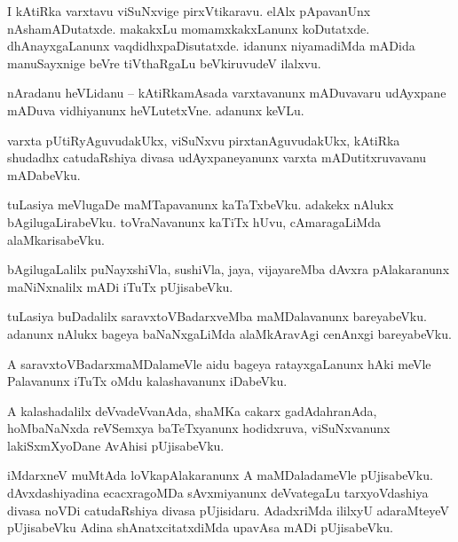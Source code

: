 \documentclass{article}
\begin{document}
\begin{mn}%
I kAtiRka varxtavu viSuNxvige pirxVtikaravu. elAlx pApavanUnx nAshamADutatxde. makakxLu 
momamxkakxLanunx koDutatxde. dhAnayxgaLanunx vaqdidhxpaDisutatxde. idanunx niyamadiMda mADida 
manuSayxnige beVre tiVthaRgaLu beVkiruvudeV ilalxvu.
\end{mn}


\begin{mn}%
nAradanu heVLidanu -- kAtiRkamAsada varxtavanunx mADuvavaru udAyxpane mADuva vidhiyanunx 
heVLutetxVne. adanunx keVLu.
\end{mn}

\begin{mn}%
varxta pUtiRyAguvudakUkx, viSuNxvu pirxtanAguvudakUkx, kAtiRka shudadhx catudaRshiya divasa 
udAyxpaneyanunx varxta mADutitxruvavanu mADabeVku.
\end{mn}

\begin{mn}%
tuLasiya meVlugaDe maMTapavanunx kaTaTxbeVku. adakekx nAlukx bAgilugaLirabeVku. toVraNavanunx 
kaTiTx hUvu, cAmaragaLiMda alaMkarisabeVku.
\end{mn}

\begin{mn}%
bAgilugaLalilx puNayxshiVla, sushiVla, jaya, vijayareMba dAvxra pAlakaranunx maNiNxnalilx mADi 
iTuTx pUjisabeVku.
\end{mn}

\begin{mn}%
tuLasiya buDadalilx saravxtoVBadarxveMba maMDalavanunx bareyabeVku. adanunx nAlukx bageya 
baNaNxgaLiMda alaMkAravAgi cenAnxgi bareyabeVku.
\end{mn}

\begin{mn}%
A saravxtoVBadarxmaMDalameVle aidu bageya ratayxgaLanunx hAki meVle Palavanunx iTuTx oMdu 
kalashavanunx iDabeVku.
\end{mn}

\begin{mn}%
A kalashadalilx deVvadeVvanAda, shaMKa cakarx gadAdahranAda, hoMbaNaNxda reVSemxya baTeTxyanunx 
hodidxruva, viSuNxvanunx lakiSxmXyoDane AvAhisi pUjisabeVku.
\end{mn}

\begin{mn}%
iMdarxneV muMtAda loVkapAlakaranunx A maMDaladameVle pUjisabeVku. dAvxdashiyadina ecacxragoMDa 
sAvxmiyanunx deVvategaLu tarxyoVdashiya divasa noVDi catudaRshiya divasa pUjisidaru. AdadxriMda 
ililxyU adaraMteyeV pUjisabeVku Adina shAnatxcitatxdiMda upavAsa mADi pUjisabeVku.
\end{mn}
\end{document}
